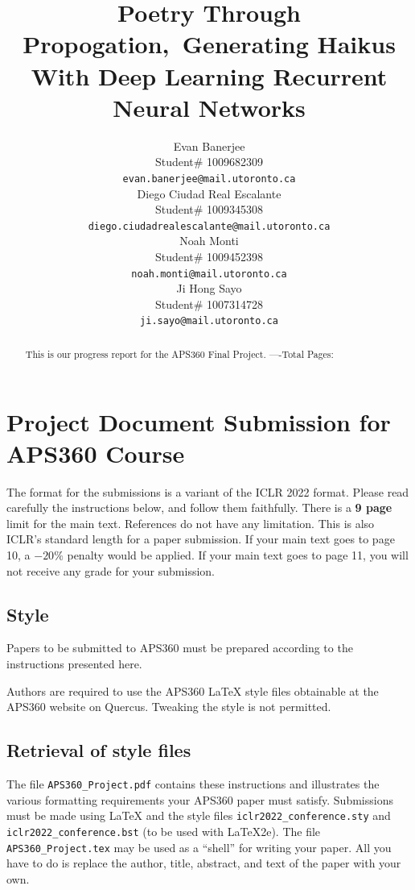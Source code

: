 \documentclass{article} %
\title{Poetry Through Propogation,\ Generating Haikus With Deep Learning Recurrent Neural Networks}
\author{Evan Banerjee  \\
Student\# 1009682309\\
\texttt{evan.banerjee@mail.utoronto.ca} \\
\And
Diego Ciudad Real Escalante  \\
Student\# 1009345308 \\
\texttt{diego.ciudadrealescalante@mail.utoronto.ca} \\
\AND
Noah Monti  \\
Student\# 1009452398 \\
\texttt{noah.monti@mail.utoronto.ca} \\
\And
Ji Hong Sayo \\
Student\# 1007314728 \\
\texttt{ji.sayo@mail.utoronto.ca} \\
\AND
}
\begin{document}
\maketitle

\begin{abstract}
This is our progress report for the APS360 Final Project.
----Total Pages: \pageref{last_page}
\end{abstract}



\section{Project Document Submission for APS360 Course}


The format for the submissions is a variant of the ICLR 2022 format.
Please read carefully the instructions below, and follow them
faithfully. There is a \textbf{9 page} limit for the main text. References do not have any limitation. This is also ICLR's standard length for a paper submission. 
If your main text goes to page 10, a $-20\%$ penalty would be applied. If your main text goes to page 11, you will not receive any grade for your submission. 

\subsection{Style}

Papers to be submitted to APS360 must be prepared according to the
instructions presented here.

Authors are required to use the APS360 \LaTeX{} style files obtainable at the
APS360 website on Quercus. Tweaking the style is not permitted.

\subsection{Retrieval of style files}

The file \verb+APS360_Project.pdf+ contains these
instructions and illustrates the various formatting requirements your APS360 paper must satisfy.
Submissions must be made using \LaTeX{} and the style files
\verb+iclr2022_conference.sty+ and \verb+iclr2022_conference.bst+ (to be used with \LaTeX{}2e). The file
\verb+APS360_Project.tex+ may be used as a ``shell'' for writing your paper. All you have to do is replace the author, title, abstract, and text of the paper with
your own.
\end{document}
